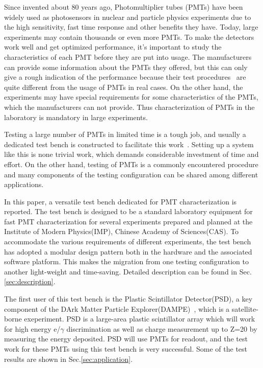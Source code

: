 \documentclass[review, times]{elsarticle}
\begin{document}
Since invented about 80 years ago, Photomultiplier tubes (PMTs) have been widely used as photosensors in nuclear and particle physics experiments due to the high sensitivity, fast time response and other benefits they have. 
Today, large experiments may contain thousands or even more PMTs. To make the detectors work well and get optimized performance, it's important to study the characteristics of each PMT before they are put into usage. 
The manufacturers can provide some information about the PMTs they offered, but this can only give a rough indication of the performance because their test procedures~\cite{hamamatsu} are quite different from the usage of PMTs in real cases. 
On the other hand, the experiments may have special requirements for some characteristics of the PMTs, which the manufacturers can not provide. 
Thus characterization of PMTs in the laboratory is mandatory in large experiments.

Testing a large number of PMTs in limited time is a tough job, and usually a dedicated test bench is constructed to facilitate this work~\cite{barnhill_testing_2008,akgun_complete_2005,adragna_pmt-block_2006}.
Setting up a system like this is none trivial work, which demands considerable investment of time and effort.
On the other hand, testing of PMTs is a commonly encountered procedure and many components of the testing configuration can be shared among different applications.

In this paper, a versatile test bench dedicated for PMT characterization is reported.
The test bench is designed to be a standard laboratory equipment for fast PMT characterization for several experiments prepared and planned at the Institute of Modern Physics(IMP), Chinese Academy of Sciences(CAS).
To accommodate the various requirements of different experiments, the test bench has adopted a modular design pattern both in the hardware and the associated software platform.
This makes the migration from one testing configuration to another light-weight and time-saving.
Detailed description can be found in Sec.\ref{sec:description}.

The first user of this test bench is the Plastic Scintillator Detector(PSD), a key component of the DArk Matter Particle Explorer(DAMPE)~\cite{Chang_Jin_dampe}, which is a satellite-borne exeperiment. 
PSD is a large-area plastic scintillator array which will work for high energy e/$\gamma$ discrimination as well as charge measurement up to Z=20 by measuring the energy deposited.
PSD will use PMTs for readout, and the test work for these PMTs using this test bench is very successful. Some of the test results are shown in Sec.\ref{sec:application}.
\end{document}

